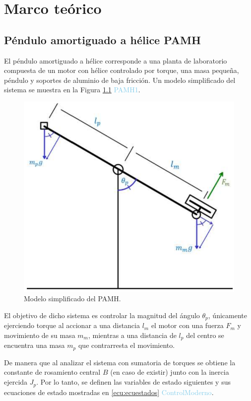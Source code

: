 \chapter{Marco teórico}
\label{ch:marco}


\section{Péndulo amortiguado a hélice PAMH}

El péndulo amortiguado a hélice corresponde a una planta de laboratorio compuesta de un motor con hélice controlado por torque, una masa pequeña, péndulo y soportes de aluminio de baja fricción. Un modelo simplificado del sistema se muestra en la Figura \ref{fig:modpen} \textcolor{SkyBlue}{PAMH1}.

\begin{figure}[h]
	\centering
	\includegraphics[scale=0.3]{fig/new/ModeloPendulo.png}
	\caption{Modelo simplificado del PAMH.}
	\label{fig:modpen}
\end{figure}

El objetivo de dicho sistema es controlar la magnitud del ángulo $\theta_p$, únicamente ejerciendo torque al accionar a una distancia $l_m$ el motor con una fuerza $F_m$ y movimiento de su masa $m_m$, mientras a una distancia de $l_p$ del centro se encuentra una masa $m_p$ que contrarresta el movimiento.

De manera que al analizar el sistema con sumatoria de torques se obtiene la constante de rosamiento central $B$ (en caso de existir) junto con la inercia ejercida $J_p$. Por lo tanto, se definen las variables de estado siguientes y sus ecuaciones de estado mostradas en \ref{ecu:ecuestados} \textcolor{SkyBlue}{ControlModerno}.

